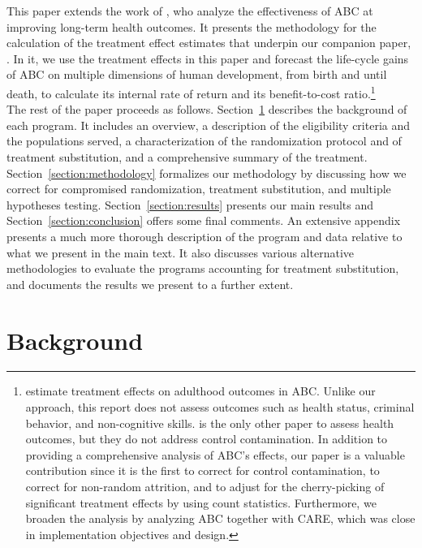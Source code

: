 \noindent This paper extends the work of \citet{Campbell_Conti_etal_2014_EarlyChildhoodInvestments}, who analyze the effectiveness of ABC at improving long-term health outcomes. It presents the methodology for the calculation of the treatment effect estimates that underpin our companion paper, \citet{Elango_et_al_2015_ABC_unpublished}. In it, we use the treatment effects in this paper and forecast the life-cycle gains of ABC on multiple dimensions of human development, from birth and until death, to calculate its internal rate of return and its benefit-to-cost ratio.\footnote{\cite{Campbell_Pungello_etal_2012_DP} estimate treatment effects on adulthood outcomes in ABC. Unlike our approach, this report does not assess outcomes such as health status, criminal behavior, and non-cognitive skills. \cite{Campbell_Conti_etal_2014_EarlyChildhoodInvestments} is the only other paper to assess health outcomes, but they do not address control contamination. In addition to providing a comprehensive analysis of ABC's effects, our paper is a valuable contribution since it is the first to correct for control contamination, to correct for non-random attrition, and to adjust for the cherry-picking of significant treatment effects by using count statistics. Furthermore, we broaden the analysis by analyzing ABC together with CARE, which was close in implementation objectives and design.}\\

\noindent The rest of the paper proceeds as follows. Section~\ref{section:background} describes the background of each program. It includes an overview, a description of the eligibility criteria and the populations served, a characterization of the randomization protocol and of treatment substitution, and a comprehensive summary of the treatment.  Section~\ref{section:methodology} formalizes our methodology by discussing how we correct for compromised randomization, treatment substitution, and multiple hypotheses testing. Section~\ref{section:results} presents our main results and Section~\ref{section:conclusion} offers some final comments. An extensive appendix presents a much more thorough description of the program and data relative to what we present in the main text. It also discusses various alternative methodologies to evaluate the programs accounting for treatment substitution, and documents the results we present to a further extent.

\section{Background} \label{section:background}
